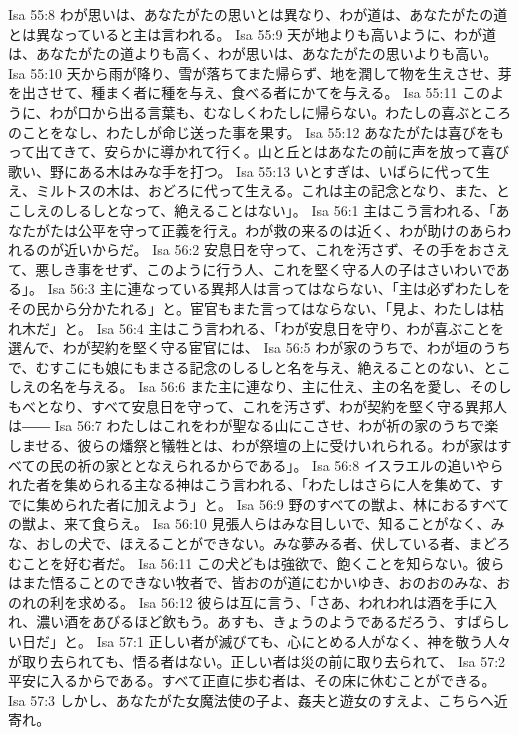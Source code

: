 Isa 55:8  わが思いは、あなたがたの思いとは異なり、わが道は、あなたがたの道とは異なっていると主は言われる。
Isa 55:9  天が地よりも高いように、わが道は、あなたがたの道よりも高く、わが思いは、あなたがたの思いよりも高い。
Isa 55:10  天から雨が降り、雪が落ちてまた帰らず、地を潤して物を生えさせ、芽を出させて、種まく者に種を与え、食べる者にかてを与える。
Isa 55:11  このように、わが口から出る言葉も、むなしくわたしに帰らない。わたしの喜ぶところのことをなし、わたしが命じ送った事を果す。
Isa 55:12  あなたがたは喜びをもって出てきて、安らかに導かれて行く。山と丘とはあなたの前に声を放って喜び歌い、野にある木はみな手を打つ。
Isa 55:13  いとすぎは、いばらに代って生え、ミルトスの木は、おどろに代って生える。これは主の記念となり、また、とこしえのしるしとなって、絶えることはない」。
Isa 56:1  主はこう言われる、「あなたがたは公平を守って正義を行え。わが救の来るのは近く、わが助けのあらわれるのが近いからだ。
Isa 56:2  安息日を守って、これを汚さず、その手をおさえて、悪しき事をせず、このように行う人、これを堅く守る人の子はさいわいである」。
Isa 56:3  主に連なっている異邦人は言ってはならない、「主は必ずわたしをその民から分かたれる」と。宦官もまた言ってはならない、「見よ、わたしは枯れ木だ」と。
Isa 56:4  主はこう言われる、「わが安息日を守り、わが喜ぶことを選んで、わが契約を堅く守る宦官には、
Isa 56:5  わが家のうちで、わが垣のうちで、むすこにも娘にもまさる記念のしるしと名を与え、絶えることのない、とこしえの名を与える。
Isa 56:6  また主に連なり、主に仕え、主の名を愛し、そのしもべとなり、すべて安息日を守って、これを汚さず、わが契約を堅く守る異邦人は――
Isa 56:7  わたしはこれをわが聖なる山にこさせ、わが祈の家のうちで楽しませる、彼らの燔祭と犠牲とは、わが祭壇の上に受けいれられる。わが家はすべての民の祈の家ととなえられるからである」。
Isa 56:8  イスラエルの追いやられた者を集められる主なる神はこう言われる、「わたしはさらに人を集めて、すでに集められた者に加えよう」と。
Isa 56:9  野のすべての獣よ、林におるすべての獣よ、来て食らえ。
Isa 56:10  見張人らはみな目しいで、知ることがなく、みな、おしの犬で、ほえることができない。みな夢みる者、伏している者、まどろむことを好む者だ。
Isa 56:11  この犬どもは強欲で、飽くことを知らない。彼らはまた悟ることのできない牧者で、皆おのが道にむかいゆき、おのおのみな、おのれの利を求める。
Isa 56:12  彼らは互に言う、「さあ、われわれは酒を手に入れ、濃い酒をあびるほど飲もう。あすも、きょうのようであるだろう、すばらしい日だ」と。
Isa 57:1  正しい者が滅びても、心にとめる人がなく、神を敬う人々が取り去られても、悟る者はない。正しい者は災の前に取り去られて、
Isa 57:2  平安に入るからである。すべて正直に歩む者は、その床に休むことができる。
Isa 57:3  しかし、あなたがた女魔法使の子よ、姦夫と遊女のすえよ、こちらへ近寄れ。
